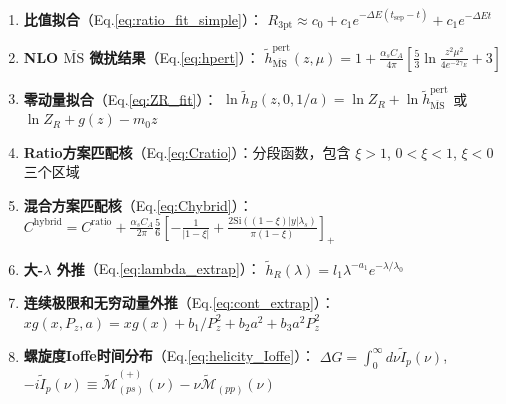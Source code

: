 \documentclass[11pt,a4paper]{article}
\newcommand{\MS}{\overline{\text{MS}}}
\newcommand{\hB}{\tilde{h}_B}
\newcommand{\hR}{\tilde{h}_R}
\newcommand{\hpert}{\tilde{h}^{\text{pert}}}
\newcommand{\tsep}{t_{\text{sep}}}
\newcommand{\Pz}{P_z}
\newcommand{\alphas}{\alpha_s}
\newcommand{\CA}{C_A}
\begin{document}
\begin{enumerate}[label=(\arabic*), leftmargin=*]
    \item \textbf{比值拟合}（Eq.\ref{eq:ratio_fit_simple}）：
    $R_{3\text{pt}} \approx c_0 + c_1 e^{-\Delta E(\tsep - t)} + c_1 e^{-\Delta E t}$

    \item \textbf{NLO $\MS$ 微扰结果}（Eq.\ref{eq:hpert}）：
    $\hpert_{\MS}(z, \mu) = 1 + \frac{\alphas \CA}{4\pi} [\frac{5}{3} \ln\frac{z^2\mu^2}{4e^{-2\gamma_E}} + 3]$

    \item \textbf{零动量拟合}（Eq.\ref{eq:ZR_fit}）：
    $\ln \hB(z, 0, 1/a) = \ln Z_R + \ln \hpert_{\MS}$ 或 $\ln Z_R + g(z) - m_0 z$

    \item \textbf{Ratio方案匹配核}（Eq.\ref{eq:Cratio}）：分段函数，包含 $\xi > 1$, $0 < \xi < 1$, $\xi < 0$ 三个区域

    \item \textbf{混合方案匹配核}（Eq.\ref{eq:Chybrid}）：
    $C^{\text{hybrid}} = C^{\text{ratio}} + \frac{\alphas \CA}{2\pi} \frac{5}{6} [-\frac{1}{|1-\xi|} + \frac{2\text{Si}((1-\xi)|y|\lambda_s)}{\pi(1-\xi)}]_+$

    \item \textbf{大-$\lambda$ 外推}（Eq.\ref{eq:lambda_extrap}）：
    $\hR(\lambda) = l_1 \lambda^{-a_1} e^{-\lambda/\lambda_0}$

    \item \textbf{连续极限和无穷动量外推}（Eq.\ref{eq:cont_extrap}）：
    $x g(x, \Pz, a) = x g(x) + b_1/\Pz^2 + b_2 a^2 + b_3 a^2 \Pz^2$

    \item \textbf{螺旋度Ioffe时间分布}（Eq.\ref{eq:helicity_Ioffe}）：
    $\Delta G = \int_0^\infty d\nu \tilde{I}_p(\nu)$, $-i \tilde{I}_p(\nu) \equiv \tilde{\mathcal{M}}^{(+)}_{(ps)}(\nu) - \nu \tilde{\mathcal{M}}_{(pp)}(\nu)$
\end{enumerate}

\end{document}
